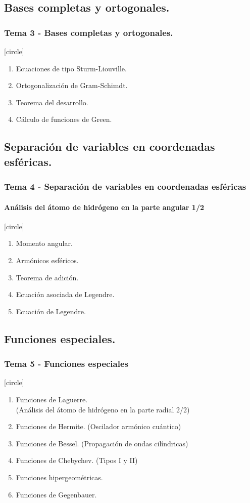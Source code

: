 \subsection{Bases completas y ortogonales.}
\begin{frame}
\frametitle{Tema 3 - Bases completas y ortogonales.}
[circle]
\begin{enumerate}[<+->]
\item Ecuaciones de tipo Sturm-Liouville.
\item Ortogonalización de Gram-Schimdt.
\item Teorema del desarrollo.
\item Cálculo de funciones de Green.   
\end{enumerate}
\end{frame}
\subsection{Separación de variables en coordenadas esféricas.}
\begin{frame}
\frametitle{Tema 4 - Separación de variables en coordenadas esféricas}
\framesubtitle{Análisis del átomo de hidrógeno en la parte angular 1/2}
[circle]
\begin{enumerate}[<+->]
\item Momento angular.
\item Armónicos esféricos.
\item Teorema de adición.
\item Ecuación asociada de Legendre.
\item Ecuación de Legendre.
\end{enumerate}
\end{frame}
\subsection{Funciones especiales.}
\begin{frame}
\frametitle{Tema 5 - Funciones especiales}
[circle]
\begin{enumerate}[<+->]
\item Funciones de Laguerre. \\ (Análisis del átomo de hidrógeno en la parte radial 2/2)
\item Funciones de Hermite. (Oscilador armónico cuántico)
\item Funciones de Bessel. (Propagación de ondas cilíndricas)
\item Funciones de Chebychev. (Tipos I y II)
\item Funciones hipergeométricas.
\item Funciones de Gegenbauer. 
\end{enumerate}
\end{frame}
